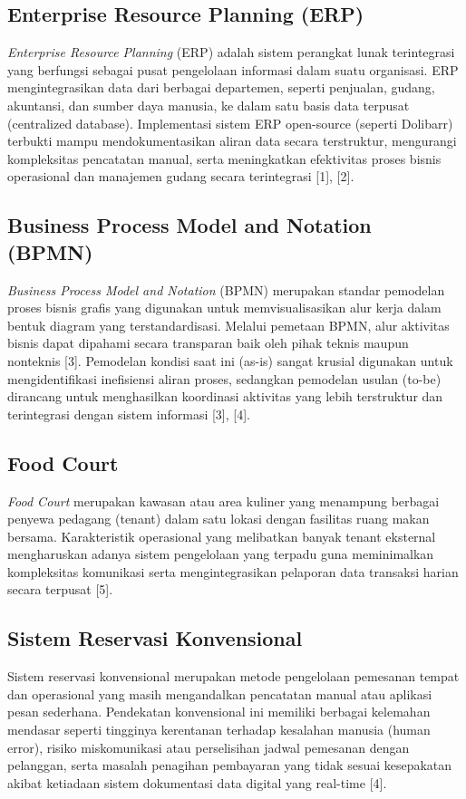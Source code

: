 \documentclass[conference]{IEEEtran}
\begin{document}
\subsection{Enterprise Resource Planning (ERP)}
\textit{Enterprise Resource Planning} (ERP) adalah sistem perangkat lunak terintegrasi yang berfungsi sebagai pusat pengelolaan informasi dalam suatu organisasi. ERP mengintegrasikan data dari berbagai departemen, seperti penjualan, gudang, akuntansi, dan sumber daya manusia, ke dalam satu basis data terpusat (centralized database). Implementasi sistem ERP open-source (seperti Dolibarr) terbukti mampu mendokumentasikan aliran data secara terstruktur, mengurangi kompleksitas pencatatan manual, serta meningkatkan efektivitas proses bisnis operasional dan manajemen gudang secara terintegrasi [1], [2].

\subsection{Business Process Model and Notation (BPMN)}
\textit{Business Process Model and Notation} (BPMN) merupakan standar pemodelan proses bisnis grafis yang digunakan untuk memvisualisasikan alur kerja dalam bentuk diagram yang terstandardisasi. Melalui pemetaan BPMN, alur aktivitas bisnis dapat dipahami secara transparan baik oleh pihak teknis maupun nonteknis [3]. Pemodelan kondisi saat ini (as-is) sangat krusial digunakan untuk mengidentifikasi inefisiensi aliran proses, sedangkan pemodelan usulan (to-be) dirancang untuk menghasilkan koordinasi aktivitas yang lebih terstruktur dan terintegrasi dengan sistem informasi [3], [4].

\subsection{Food Court}
\textit{Food Court} merupakan kawasan atau area kuliner yang menampung berbagai penyewa pedagang (tenant) dalam satu lokasi dengan fasilitas ruang makan bersama. Karakteristik operasional yang melibatkan banyak tenant eksternal mengharuskan adanya sistem pengelolaan yang terpadu guna meminimalkan kompleksitas komunikasi serta mengintegrasikan pelaporan data transaksi harian secara terpusat [5].

\subsection{Sistem Reservasi Konvensional}
Sistem reservasi konvensional merupakan metode pengelolaan pemesanan tempat dan operasional yang masih mengandalkan pencatatan manual atau aplikasi pesan sederhana. Pendekatan konvensional ini memiliki berbagai kelemahan mendasar seperti tingginya kerentanan terhadap kesalahan manusia (human error), risiko miskomunikasi atau perselisihan jadwal pemesanan dengan pelanggan, serta masalah penagihan pembayaran yang tidak sesuai kesepakatan akibat ketiadaan sistem dokumentasi data digital yang real-time [4].
\end{document}
